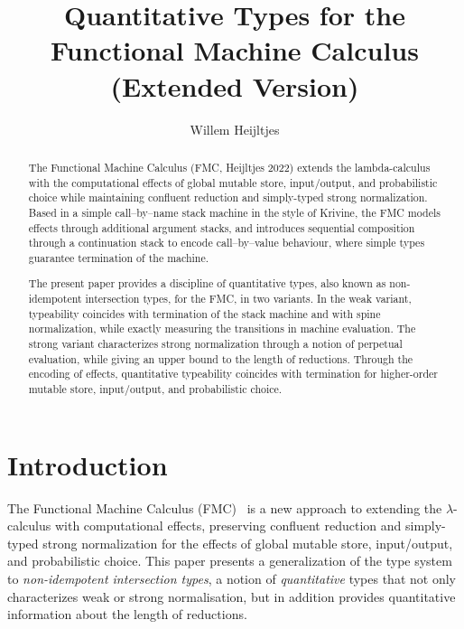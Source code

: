 \documentclass[a4paper,UKenglish,cleveref, autoref, thm-restate]{lipics-v2021}
\title{Quantitative Types for the Functional Machine Calculus (Extended Version)}
\author
	{Willem Heijltjes}
	{Department of Computer Science, University of Bath, UK \and \url{http://willem.heijltj.es}}
	{w.b.heijltjes@bath.ac.uk}
	{https://orcid.org/0009-0001-8941-1150}
	{}
\begin{document}
\maketitle

\begin{abstract}
The Functional Machine Calculus (FMC, Heijltjes 2022) extends the lambda-calculus with the computational effects of global mutable store, input/output, and probabilistic choice while maintaining confluent reduction and simply-typed strong normalization. Based in a simple call--by--name stack machine in the style of Krivine, the FMC models effects through additional argument stacks, and introduces sequential composition through a continuation stack to encode call--by--value behaviour, where simple types guarantee termination of the machine.

The present paper provides a discipline of quantitative types, also known as non-idempotent intersection types, for the FMC, in two variants. In the weak variant, typeability coincides with termination of the stack machine and with spine normalization, while exactly measuring the transitions in machine evaluation. The strong variant characterizes strong normalization through a notion of perpetual evaluation, while giving an upper bound to the length of reductions. Through the encoding of effects, quantitative typeability coincides with termination for higher-order mutable store, input/output, and probabilistic choice.
\end{abstract}

\section{Introduction}

The Functional Machine Calculus (FMC)~\cite{Barrett-Heijltjes-McCusker-2023,Heijltjes-2022} is a new approach to extending the $\lambda$-calculus with computational effects, preserving confluent reduction and simply-typed strong normalization for the effects of global mutable store, input/output, and probabilistic choice. This paper presents a generalization of the type system to \emph{non-idempotent intersection types}, a notion of \emph{quantitative} types that not only characterizes weak or strong normalisation, but in addition provides quantitative information about the length of reductions.
\end{document}
